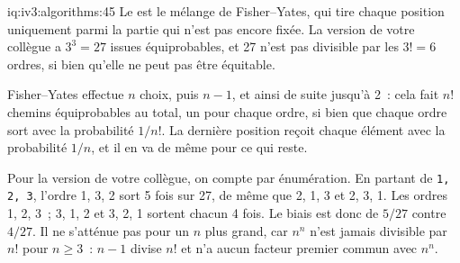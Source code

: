 \begin{solution}{iq:iv3:algorithms:45}
Le  est le mélange de Fisher--Yates, qui tire chaque position uniquement parmi la partie qui n'est pas encore fixée. La version de votre collègue a $3^3 = 27$ issues équiprobables, et 27 n'est pas divisible par les $3! = 6$ ordres, si bien qu'elle ne peut pas être équitable.
\enlargethispage{-3\baselineskip}%
\label{lst:iv3:al:shuffle}

Fisher--Yates effectue $n$ choix, puis $n - 1$, et ainsi de suite jusqu'à 2~: cela fait $n!$ chemins équiprobables au total, un pour chaque ordre, si bien que chaque ordre sort avec la probabilité $1/n!$. La dernière position reçoit chaque élément avec la probabilité $1/n$, et il en va de même pour ce qui reste.

Pour la version de votre collègue, on compte par énumération. En partant de \texttt{1, 2, 3}, l'ordre 1, 3, 2 sort 5 fois sur 27, de même que 2, 1, 3 et 2, 3, 1. Les ordres 1, 2, 3~; 3, 1, 2 et 3, 2, 1 sortent chacun 4 fois. Le biais est donc de $5/27$ contre $4/27$. Il ne s'atténue pas pour un $n$ plus grand, car $n^n$ n'est jamais divisible par $n!$ pour $n \ge 3$~: $n - 1$ divise $n!$ et n'a aucun facteur premier commun avec $n^n$.

\end{solution}

